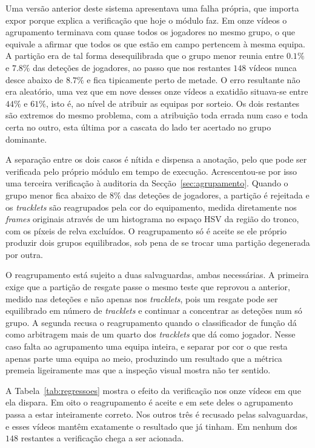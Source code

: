 Uma versão anterior deste sistema apresentava uma falha própria, que importa expor porque explica a
verificação que hoje o módulo faz. Em onze vídeos o agrupamento terminava com quase todos os
jogadores no mesmo grupo, o que equivale a afirmar que todos os que estão em campo pertencem à mesma
equipa. A partição era de tal forma desequilibrada que o grupo menor reunia entre $0.1\%$ e $7.8\%$
das deteções de jogadores, ao passo que nos restantes $148$ vídeos nunca desce abaixo de $8.7\%$ e
fica tipicamente perto de metade. O erro resultante não era aleatório, uma vez que em nove desses onze
vídeos a exatidão situava-se entre $44\%$ e $61\%$, isto é, ao nível de atribuir as equipas por
sorteio. Os dois restantes são extremos do mesmo problema, com a atribuição toda errada num caso e
toda certa no outro, esta última por a cascata do lado ter acertado no grupo dominante.

A separação entre os dois casos é nítida e dispensa a anotação, pelo que pode ser verificada pelo
próprio módulo em tempo de execução. Acrescentou-se por isso uma terceira verificação à auditoria da
Secção~\ref{sec:agrupamento}. Quando o grupo menor fica abaixo de $8\%$ das deteções de jogadores, a
partição é rejeitada e os \emph{tracklets} são reagrupados pela cor do equipamento, medida
diretamente nos \emph{frames} originais através de um histograma no espaço HSV da região do tronco,
com os píxeis de relva excluídos. O reagrupamento só é aceite se ele próprio produzir dois grupos
equilibrados, sob pena de se trocar uma partição degenerada por outra.

O reagrupamento está sujeito a duas salvaguardas, ambas necessárias. A primeira exige que a
partição de resgate passe o mesmo teste que reprovou a anterior, medido nas deteções e não apenas
nos \emph{tracklets}, pois um resgate pode ser equilibrado em número de \emph{tracklets} e continuar
a concentrar as deteções num só grupo. A segunda recusa o reagrupamento quando o classificador de
função dá como arbitragem mais de um quarto dos \emph{tracklets} que dá como jogador. Nesse caso
falta ao agrupamento uma equipa inteira, e separar por cor o que resta apenas parte uma equipa ao
meio, produzindo um resultado que a métrica premeia ligeiramente mas que a inspeção visual mostra
não ter sentido.

A Tabela~\ref{tab:regressoes} mostra o efeito da verificação nos onze vídeos em que ela dispara.
Em oito o reagrupamento é aceite e em sete deles o agrupamento passa a estar inteiramente correto.
Nos outros três é recusado pelas salvaguardas, e esses vídeos mantêm exatamente o resultado que já
tinham. Em nenhum dos $148$ restantes a verificação chega a ser acionada.

